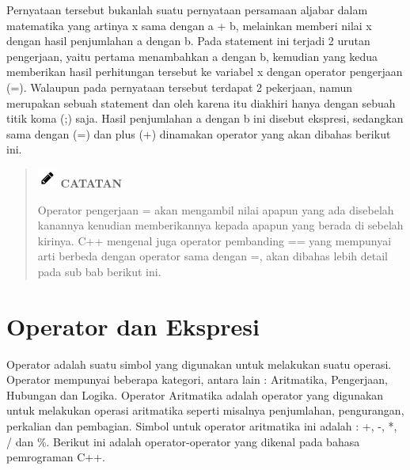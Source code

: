 Pernyataan tersebut bukanlah suatu pernyataan persamaan aljabar dalam
matematika yang artinya x sama dengan a + b, melainkan memberi nilai x
dengan hasil penjumlahan a dengan b. Pada statement ini terjadi 2 urutan
pengerjaan, yaitu pertama menambahkan a dengan b, kemudian yang kedua
memberikan hasil perhitungan tersebut ke variabel x dengan operator
pengerjaan (=). Walaupun pada pernyataan tersebut terdapat 2 pekerjaan,
namun merupakan sebuah statement dan oleh karena itu diakhiri hanya
dengan sebuah titik koma (;) saja. Hasil penjumlahan a dengan b ini
disebut ekspresi, sedangkan sama dengan (=) dan plus (+) dinamakan
operator yang akan dibahas berikut ini.

\begin{quotation}
\includegraphics{../manuscript/images/pencil.png} \textbf{CATATAN}
 
 Operator pengerjaan = akan mengambil nilai apapun yang ada disebelah
 kanannya kenudian memberikannya kepada apapun yang berada di sebelah
 kirinya. C++ mengenal juga operator pembanding == yang mempunyai
 arti berbeda dengan operator sama dengan =, akan dibahas lebih
 detail pada sub bab berikut ini.
\end{quotation}


\section{Operator dan Ekspresi}\label{operator-dan-ekspresi}

Operator adalah suatu simbol yang digunakan untuk melakukan suatu
operasi. Operator mempunyai beberapa kategori, antara lain : Aritmatika,
Pengerjaan, Hubungan dan Logika. Operator Aritmatika adalah operator
yang digunakan untuk melakukan operasi aritmatika seperti misalnya
penjumlahan, pengurangan, perkalian dan pembagian. Simbol untuk operator
aritmatika ini adalah : +, -, *, / dan \%. Berikut ini adalah
operator-operator yang dikenal pada bahasa pemrograman C++.

